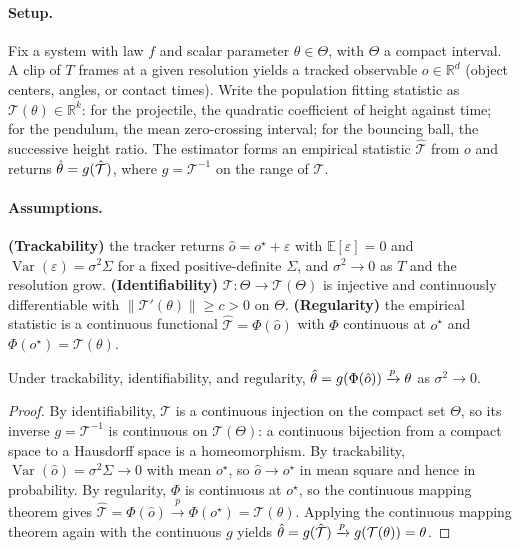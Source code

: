 \documentclass[10pt,twocolumn,letterpaper]{article}
\begin{document}
\paragraph{Setup.}
Fix a system with law $f$ and scalar parameter $\theta\in\Theta$, with
$\Theta$ a compact interval. A clip of $T$ frames at a given resolution
yields a tracked observable $o\in\mathbb{R}^{d}$ (object centers, angles, or
contact times). Write the population fitting statistic as
$\mathcal{T}(\theta)\in\mathbb{R}^{k}$: for the projectile, the quadratic
coefficient of height against time; for the pendulum, the mean zero-crossing
interval; for the bouncing ball, the successive height ratio. The estimator
forms an empirical statistic $\hat{\mathcal{T}}$ from $o$ and returns
$\hat{\theta}=g(\hat{\mathcal{T}})$, where $g=\mathcal{T}^{-1}$ on the range of
$\mathcal{T}$.

\paragraph{Assumptions.}
\textbf{(Trackability)} the tracker returns
$\hat o = o^\star + \varepsilon$ with $\mathbb{E}[\varepsilon]=0$ and
$\operatorname{Var}(\varepsilon)=\sigma^2\Sigma$ for a fixed positive-definite
$\Sigma$, and $\sigma^2\to 0$ as $T$ and the resolution grow.
\textbf{(Identifiability)} $\mathcal{T}:\Theta\to\mathcal{T}(\Theta)$ is
injective and continuously differentiable with
$\|\mathcal{T}'(\theta)\|\ge c>0$ on $\Theta$.
\textbf{(Regularity)} the empirical statistic is a continuous functional
$\hat{\mathcal{T}}=\Phi(\hat o)$ with $\Phi$ continuous at $o^\star$ and
$\Phi(o^\star)=\mathcal{T}(\theta)$.

\begin{propositionstar}
\label{prop:consistency-restated}
Under trackability, identifiability, and regularity,
$\hat{\theta}=g(\Phi(\hat o)) \xrightarrow{p} \theta$ as $\sigma^2\to 0$.
\end{propositionstar}

\begin{proof}
By identifiability, $\mathcal{T}$ is a continuous injection on the compact set $\Theta$,
so its inverse $g=\mathcal{T}^{-1}$ is continuous on $\mathcal{T}(\Theta)$: a
continuous bijection from a compact space to a Hausdorff space is a
homeomorphism. By trackability, $\operatorname{Var}(\hat o)=\sigma^2\Sigma\to 0$ with
mean $o^\star$, so $\hat o\to o^\star$ in mean square and hence in
probability. By regularity, $\Phi$ is continuous at $o^\star$, so the continuous
mapping theorem gives
$\hat{\mathcal{T}}=\Phi(\hat o)\xrightarrow{p}\Phi(o^\star)=\mathcal{T}(\theta)$.
Applying the continuous mapping theorem again with the continuous $g$ yields
$\hat{\theta}=g(\hat{\mathcal{T}})\xrightarrow{p} g(\mathcal{T}(\theta))=\theta$.
\end{proof}
\end{document}
